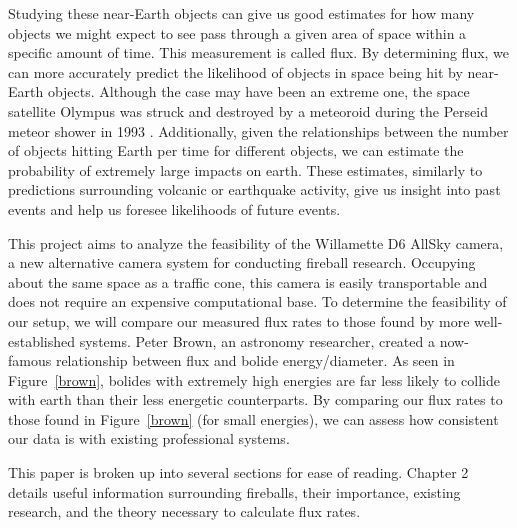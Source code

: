 Studying these near-Earth objects can give us good estimates for how many objects we might expect to see pass through a given area of space within a specific amount of time.
This measurement is called flux.
By determining flux, we can more accurately predict the likelihood of objects in space being hit by near-Earth objects. 
Although the case may have been an extreme one, the space satellite Olympus was struck and destroyed by a meteoroid during the Perseid meteor shower in 1993 \cite{bobrowsky_comet/asteroid_nodate}.
Additionally, given the relationships between the number of objects hitting Earth per time for different objects, we can estimate the probability of extremely large impacts on earth.
These estimates, similarly to predictions surrounding volcanic or earthquake activity, give us insight into past events and help us foresee likelihoods of future events.

This project aims to analyze the feasibility of the Willamette D6 AllSky camera, a new alternative camera system for conducting fireball research. 
Occupying about the same space as a traffic cone, this camera is easily transportable and does not require an expensive computational base.
To determine the feasibility of our setup, we will compare our measured flux rates to those found by more well-established systems.
Peter Brown, an astronomy researcher, created a now-famous relationship between flux and bolide energy/diameter. 
As seen in Figure~\ref{brown}, bolides with extremely high energies are far less likely to collide with earth than their less energetic counterparts.
By comparing our flux rates to those found in Figure~\ref{brown} (for small energies), we can assess how consistent our data is with existing professional systems.

This paper is broken up into several sections for ease of reading. Chapter 2 details useful information surrounding fireballs, their importance, existing research, and the theory necessary to calculate flux rates.
